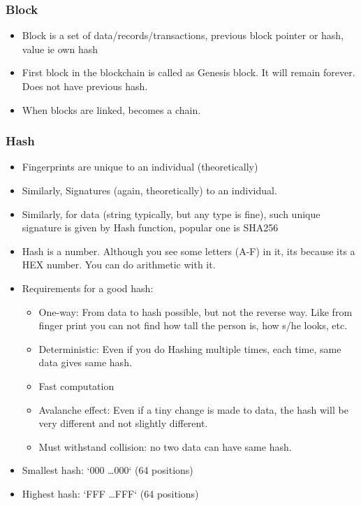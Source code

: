 \begin{frame}[fragile]\frametitle{Block}
\begin{itemize}
\item Block is a set of data/records/transactions, previous block pointer or hash, value ie own hash
\item First block in the blockchain is called as Genesis block. It will remain forever. Does not have previous hash.
\item When blocks are linked, becomes a chain.
\end{itemize}

\end{frame}

\begin{frame}[fragile]\frametitle{Hash}
\begin{itemize}
\item Fingerprints are unique to an individual (theoretically)
\item Similarly, Signatures (again, theoretically) to an individual.
\item Similarly, for data (string typically, but any type is fine), such unique signature is given by Hash function, popular one is SHA256
\item Hash is a number. Although you see some letters (A-F) in it, its because its a HEX number. You can do arithmetic with it.
\item Requirements for a good hash:
	\begin{itemize}
	\item One-way: From data to hash possible, but not the reverse way. Like from finger print you can not find how tall the person is, how s/he looks, etc.
	\item Deterministic: Even if you do Hashing multiple times, each time, same data gives same hash.
	\item Fast computation
	\item Avalanche effect: Even if a tiny change is made to data, the hash will be very different and not slightly different.
	\item Must withstand collision: no two data can have same hash.
	\end{itemize}
\item Smallest hash: `000 \ldots 000` (64 positions)
\item Highest hash: `FFF \ldots FFF` (64 positions)
\end{itemize}

\end{frame}

